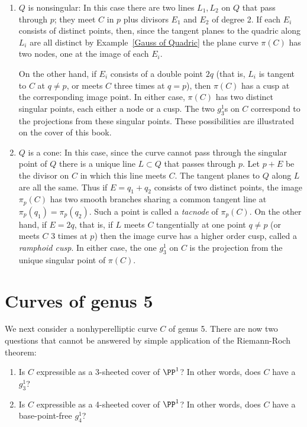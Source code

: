 \begin{enumerate}
\item $Q$ is nonsingular:
In this case there are two lines $L_1, L_2$ on $Q$ that pass through $p$; they meet $C$ in $p$ plus divisors $E_1$ and $E_2$ of degree 2. If each $E_i$ consists of distinct points, then, since the tangent planes to the quadric along $L_i$ are all distinct by Example~\ref{Gauss of Quadric} the plane curve $\pi(C)$ has two nodes, one at the image of each $E_i$.

On the other hand, if $E_i$ consists of a double point $2q$ (that is, $L_i$ is tangent to $C$ at $q\neq p$, or meets $C$ three times at $q = p$), then $\pi(C)$ has a cusp at the corresponding image point. 
In either case, $\pi(C)$ has two distinct singular points, each either a node or a cusp. The two $g^1_3$s on $C$ correspond to the projections from these singular points. These possibilities are illustrated on the cover of this book.


\item $Q$ is a cone:
In this case, since the curve cannot pass through the singular point of $Q$ there is a unique line $L\subset Q$ that passes through $p$. Let $p+E$ be the divisor on $C$ in which this line meets $C$. The tangent planes to $Q$ along $L$ are all the same. Thus if $E = q_1+q_2$ consists of two distinct points, the image $\pi_p(C)$ has two smooth branches sharing a common tangent line at
$\pi_p(q_1) = \pi_p(q_2)$. Such a point is called a \emph{tacnode} of $\pi_p(C)$. On the other hand, if $E= 2q$, that is, if $L$ meets $C$ tangentially at one point $q\neq p$ (or meets $C$ 3 times at $p$) then the image curve has a higher order cusp, called a \emph{ramphoid cusp}. In either case, the one $g^1_3$ on $C$ is the projection from the unique singular point of $\pi(C)$.

\end{enumerate}

\section{Curves of genus 5}

We next consider a nonhyperelliptic curve $C$ of genus 5. There are now two questions that cannot be answered by simple application of the Riemann-Roch theorem:

\begin{enumerate}
\item Is $C$ expressible as a 3-sheeted cover of $\PP^1$? In other words, does $C$ have a $g^1_3$?
\item Is $C$ expressible as a 4-sheeted cover of $\PP^1$? In other words, does $C$ have a base-point-free $g^1_4$?
\end{enumerate}

